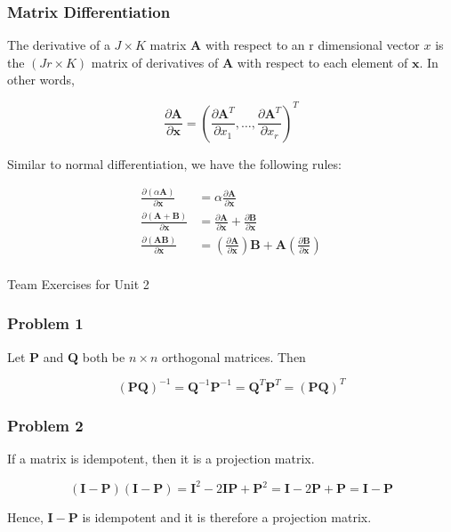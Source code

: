 \documentclass{beamer}
\begin{document}
\begin{frame}
\frametitle{Matrix Differentiation}
The derivative of a $J \times K$ matrix $\mathbf{A}$ with respect to an r dimensional vector $x$ is the $(Jr \times K)$ matrix of derivatives of $\mathbf{A}$ with respect to each element of $\mathbf{x}$.  In other words,

\[\frac{\partial \mathbf{A}}{\partial \mathbf{x}} = \left(\frac{\partial \mathbf{A}^T}{\partial x_1}, \hdots, \frac{\partial \mathbf{A}^T}{\partial x_r}  \right)^T\]

Similar to normal differentiation, we have the following rules:

\begin{align*}
\frac{\partial (\alpha \mathbf{A})}{\partial \mathbf{x}} &= \alpha \frac{\partial \mathbf{A}}{\partial \mathbf{x}}\\
\frac{\partial (\mathbf{A+B})}{\partial \mathbf{x}} &=  \frac{\partial \mathbf{A}}{\partial \mathbf{x}} + \frac{\partial \mathbf{B}}{\partial \mathbf{x}}\\
\frac{\partial (\mathbf{AB})}{\partial \mathbf{x}} &=  \left(\frac{\partial \mathbf{A}}{\partial \mathbf{x}}\right)\mathbf{B} + \mathbf{A}\left(\frac{\partial \mathbf{B}}{\partial \mathbf{x}}\right)\\
\end{align*}
\end{frame}

\begin{frame}
\begin{center}
\Huge Team Exercises for Unit 2
\end{center}
\end{frame}

\begin{frame}
\frametitle{Problem 1}
Let $\mathbf{P}$ and $\mathbf{Q}$ both be $n \times n$ orthogonal matrices.  Then

 $$(\mathbf{PQ})^{-1} = \mathbf{Q}^{-1}\mathbf{P}^{-1} = \mathbf{Q}^T \mathbf{P}^T = (\mathbf{PQ})^T$$
\end{frame}

\begin{frame}
\frametitle{Problem 2}
If a matrix is idempotent, then it is a projection matrix.

$$(\mathbf{I} - \mathbf{P})(\mathbf{I} - \mathbf{P}) = \mathbf{I}^2 - 2\mathbf{IP} + \mathbf{P}^2 = \mathbf{I} - 2\mathbf{P} + \mathbf{P} = \mathbf{I} - \mathbf{P}$$

Hence, $\mathbf{I} - \mathbf{P}$ is idempotent and it is therefore a projection matrix.
\end{frame}
\end{document}
